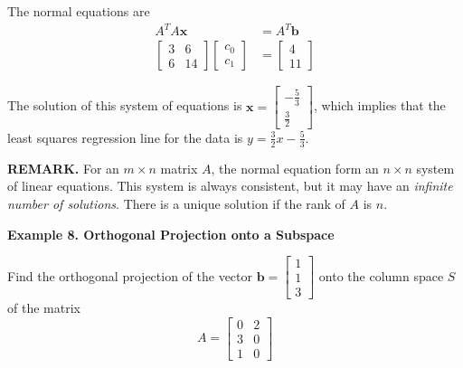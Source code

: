\documentclass{article}
\newcommand\B{\textbf}
\newcommand\x{\times}
\newcommand\T{\textit}
\begin{document}
    The normal equations are
    \begin{equation*}
        \begin{split}
            A^TA\B{x} & = A^T\B{b} \\
            \begin{bmatrix}
                3 & 6 \\
                6 & 14
            \end{bmatrix} 
            \begin{bmatrix}
                c_0 \\ c_1
            \end{bmatrix} & =
            \begin{bmatrix}
                4 \\
                11
            \end{bmatrix}
        \end{split}
    \end{equation*}

    The solution of this system of equations is $\B{x} = \begin{bmatrix}
        -\frac{5}{3} \\
        \frac{3}{2}
    \end{bmatrix}$, which implies that the least squares regression line for the data is $y =\frac{3}{2}x -\frac{5}{3}$.
    
    \B{REMARK.} For an $m \x n$ matrix $A$, the normal equation form an $n \x n$ system of linear equations. This system is
    always consistent, but it may have an \T{infinite number of solutions}. There is a unique solution if the rank of
    $A$ is $n$.

    \B{Example 8. \textcolor{blue5}{Orthogonal Projection onto a Subspace}}
    
    Find the orthogonal projection of the vector $\B{b} = \begin{bmatrix}
        1 \\ 1 \\ 3
    \end{bmatrix}$ onto the column space $S$ of the matrix
    \[ A = \begin{bmatrix}
        0 & 2 \\
        3 & 0 \\
        1 & 0
    \end{bmatrix} \]
\end{document}
